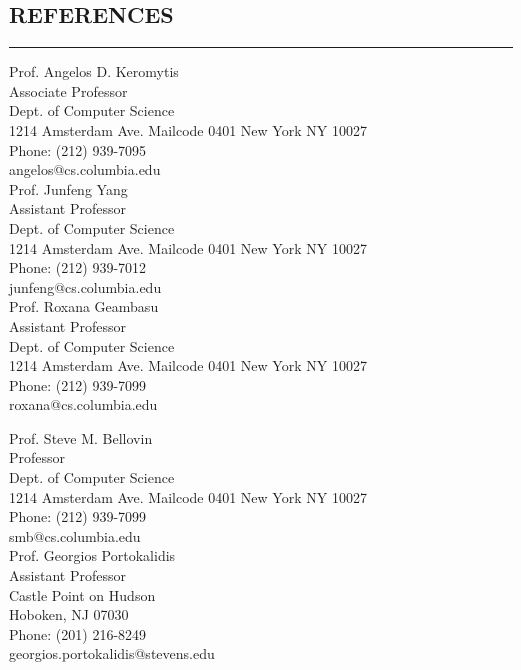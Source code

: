 \documentclass[10pt,a4]{article}
\begin{document}
\begin{small}
\subsection*{REFERENCES}
\hrule
\vspace{0.2cm}

\begin{footnotesize}

\begin{multicols}{2} 
\noindent 
Prof. Angelos D. Keromytis \\
Associate Professor \\
Dept. of Computer Science \\
1214 Amsterdam Ave. Mailcode 0401
New York NY 10027 \\
Phone: (212) 939-7095 \\
angelos@cs.columbia.edu \\

\noindent
Prof. Junfeng Yang\\
Assistant Professor \\
Dept. of Computer Science \\
1214 Amsterdam Ave. Mailcode 0401
New York NY 10027 \\
Phone: (212) 939-7012 \\
junfeng@cs.columbia.edu \\

\noindent
Prof. Roxana Geambasu\\
Assistant Professor \\
Dept. of Computer Science \\
1214 Amsterdam Ave. Mailcode 0401
New York NY 10027 \\
Phone: (212) 939-7099 \\
roxana@cs.columbia.edu \\
\columnbreak

\noindent
Prof. Steve M. Bellovin \\
Professor \\
Dept. of Computer Science \\
1214 Amsterdam Ave. Mailcode 0401
New York NY 10027 \\
Phone: (212) 939-7099 \\
smb@cs.columbia.edu \\

\noindent
Prof. Georgios Portokalidis \\
Assistant Professor \\
Castle Point on Hudson \\
Hoboken, NJ 07030 \\
Phone: (201) 216-8249 \\
georgios.portokalidis@stevens.edu \\

  
\end{multicols}

\end{footnotesize}
\end{small}
\end{document}
